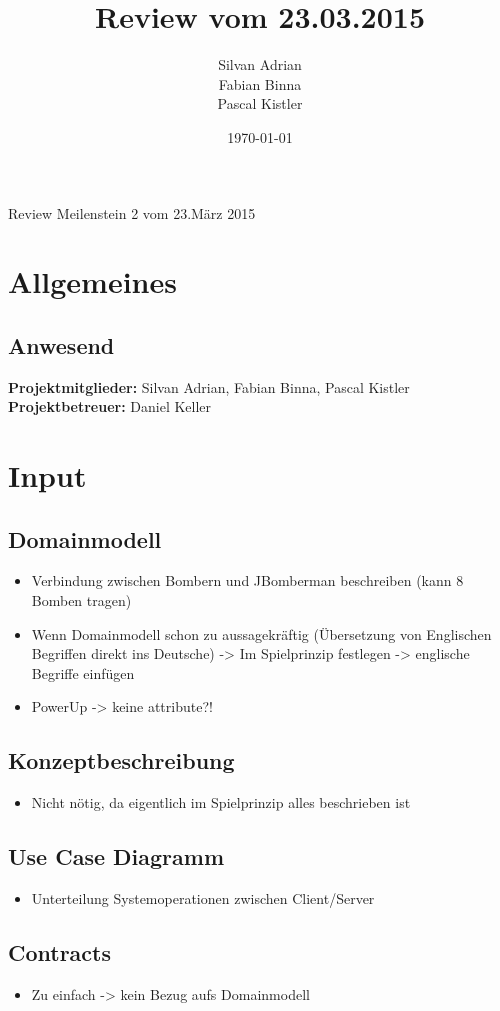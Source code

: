 \documentclass[11pt]{scrartcl}
\title{Review vom 23.03.2015}
\author{Silvan Adrian \\ Fabian Binna \\ Pascal Kistler}
\date{\today{}}
\begin{document}
{\huge Review Meilenstein 2 vom 23.März 2015}

\section{Allgemeines}
\label{sec:Allgemein}

\subsection{Anwesend}
\label{sec:Anwesend}
\textbf{Projektmitglieder:} Silvan Adrian, Fabian Binna, Pascal Kistler \\
\textbf{Projektbetreuer:} Daniel Keller
\section{Input}
\label{sec:Input}
\subsection{Domainmodell}
\label{sec:Domainmodell}
\begin{itemize}
    \item Verbindung zwischen Bombern und JBomberman beschreiben (kann 8 Bomben tragen)
    \item Wenn Domainmodell schon zu aussagekräftig (Übersetzung von Englischen Begriffen direkt ins Deutsche) -> Im Spielprinzip festlegen -> englische Begriffe einfügen
    \item PowerUp -> keine attribute?!
\end{itemize}
\subsection{Konzeptbeschreibung}
\label{sec:Konzeptbeschreibung}
\begin{itemize}
    \item Nicht nötig, da eigentlich im Spielprinzip alles beschrieben ist
\end{itemize}
\subsection{Use Case Diagramm}
\begin{itemize}
    \item Unterteilung Systemoperationen zwischen Client/Server
\end{itemize}
\subsection{Contracts}
\begin{itemize}
    \item Zu einfach -> kein Bezug aufs Domainmodell
\end{itemize}
\end{document}
